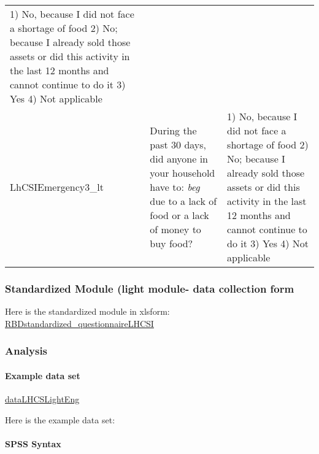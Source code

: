\documentclass[
]{article}
\begin{document}
\begin{longtable}[]{@{}lll@{}}
\begin{minipage}[t]{0.27\columnwidth}
1) No, because I did not face a shortage of food 2) No; because I already sold those assets or did this activity in the last 12 months and cannot continue to do it 3) Yes 4) Not applicable\strut
\end{minipage}\tabularnewline
\begin{minipage}[t]{0.15\columnwidth}\raggedright
LhCSIEmergency3\_lt\strut
\end{minipage} & \begin{minipage}[t]{0.49\columnwidth}\raggedright
During the past 30 days, did anyone in your household have to: \emph{beg } due to a lack of food or a lack of money to buy food?\strut
\end{minipage} & \begin{minipage}[t]{0.27\columnwidth}\raggedright
1) No, because I did not face a shortage of food 2) No; because I already sold those assets or did this activity in the last 12 months and cannot continue to do it 3) Yes 4) Not applicable\strut
\end{minipage}\tabularnewline
\bottomrule
\end{longtable}

\hypertarget{standardized-module-light-module--data-collection-form}{%
\subsubsection{Standardized Module (light module- data collection form}\label{standardized-module-light-module--data-collection-form}}

Here is the standardized module in xlsform: \href{https://www.dropbox.com/s/wfiuy5kn8yhd0ct/RBDstandardized_questionnaireLHCSI.xlsx?dl=0}{RBDstandardized\_questionnaireLHCSI}

\hypertarget{analysis-2}{%
\subsubsection{Analysis}\label{analysis-2}}

\hypertarget{example-data-set-2}{%
\paragraph{Example data set}\label{example-data-set-2}}

\href{https://www.dropbox.com/s/44f5or8njr1nlr8/dataLHCSLightEng.sav?dl=0}{dataLHCSLightEng}

Here is the example data set:

\hypertarget{spss-syntax-2}{%
\paragraph{SPSS Syntax}\label{spss-syntax-2}}
\end{document}
